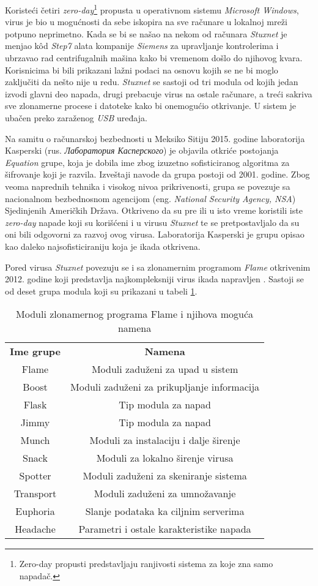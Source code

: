 \documentclass[a4paper]{article}
\begin{document}
Koristeći četiri \textit{zero-day}\footnote{Zero-day propusti predstavljaju ranjivosti sistema za koje zna samo napadač.} propusta u operativnom sistemu \textit{Microsoft Windows}, virus je bio u mogućnosti da sebe iskopira na sve računare u lokalnoj mreži potpuno neprimetno. Kada se bi se našao na nekom od računara \textit{Stuxnet} je menjao kôd \textit{Step7} alata kompanije \textit{Siemens} za upravljanje kontrolerima i ubrzavao rad centrifugalnih mašina kako bi vremenom došlo do njihovog kvara. Korisnicima bi bili prikazani lažni podaci na osnovu kojih se ne bi moglo zaključiti da nešto nije u redu. \textit{Stuxnet} se sastoji od tri modula od kojih jedan izvodi glavni deo napada, drugi prebacuje virus na ostale računare, a treći sakriva sve zlonamerne procese i datoteke kako bi onemogućio otkrivanje. U sistem je ubačen preko zaraženog \textit{USB} uređaja.

Na samitu o računarskoj bezbednosti u Meksiko Sitiju 2015. godine laboratorija Kasperski (rus. \textit{Лаборатория Касперского}) je objavila otkriće postojanja \textit{Equation} grupe, koja je dobila ime zbog izuzetno sofisticiranog algoritma za šifrovanje koji je razvila. Izveštaji navode da grupa postoji od 2001. godine. Zbog veoma naprednih tehnika i visokog nivoa prikrivenosti, grupa se povezuje sa nacionalnom bezbednosnom agencijom (eng. \textit{National Security Agency, NSA}) Sjedinjenih Američkih Država. Otkriveno da su pre ili u isto vreme koristili iste \textit{zero-day} napade koji su korišćeni i u virusu \textit{Stuxnet} te se pretpostavljalo da su oni bili odgovorni za razvoj ovog virusa. Laboratorija Kasperski je grupu opisao kao daleko najsofisticiraniju koja je ikada otkrivena.

Pored virusa \textit{Stuxnet} povezuju se i sa zlonamernim programom \textit{Flame} otkrivenim 2012. godine koji predstavlja najkompleksniji virus ikada napravljen \cite{flame}. Sastoji se od deset grupa modula koji su prikazani u tabeli \ref{table:1}.

\begin{table}[h!]
\centering
\begin{tabular}{||c  c||} 
 \hline
 \textbf{Ime grupe} & \textbf{Namena} \\ 
 Flame & Moduli zaduženi za upad u sistem \\ 
 Boost & Moduli zaduženi za prikupljanje informacija \\
 Flask & Tip modula za napad \\
 Jimmy & Tip modula za napad \\
 Munch & Moduli za instalaciju i dalje širenje \\
 Snack & Moduli za lokalno širenje virusa \\
 Spotter & Moduli zaduženi za skeniranje sistema \\
 Transport & Moduli zaduženi za umnožavanje \\
 Euphoria & Slanje podataka ka ciljnim serverima \\
 Headache & Parametri i ostale karakteristike napada \\ [1ex] 
 \hline
\end{tabular}
\caption{Moduli zlonamernog programa Flame i njihova moguća namena}
\label{table:1}
\end{table}
\end{document}

